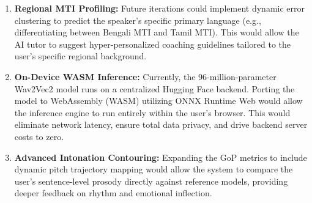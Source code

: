 \begin{enumerate}
    \item \textbf{Regional MTI Profiling:} Future iterations could implement dynamic error clustering to predict the speaker's specific primary language (e.g., differentiating between Bengali MTI and Tamil MTI). This would allow the AI tutor to suggest hyper-personalized coaching guidelines tailored to the user's specific regional background.
    \item \textbf{On-Device WASM Inference:} Currently, the 96-million-parameter Wav2Vec2 model runs on a centralized Hugging Face backend. Porting the model to WebAssembly (WASM) utilizing ONNX Runtime Web would allow the inference engine to run entirely within the user's browser. This would eliminate network latency, ensure total data privacy, and drive backend server costs to zero.
    \item \textbf{Advanced Intonation Contouring:} Expanding the GoP metrics to include dynamic pitch trajectory mapping would allow the system to compare the user's sentence-level prosody directly against reference models, providing deeper feedback on rhythm and emotional inflection.
\end{enumerate}

